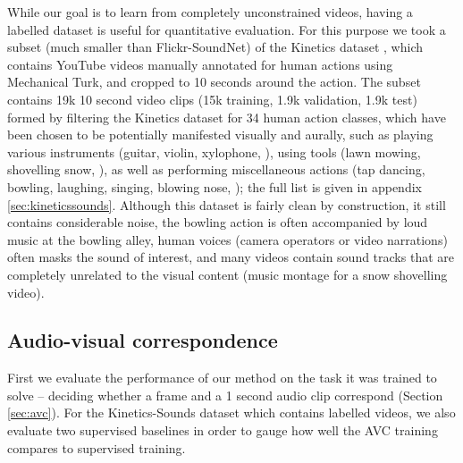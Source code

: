 \documentclass[10pt,twocolumn,letterpaper]{article}
\renewcommand{\paragraph}[1]{\smallskip\noindent{\bf{#1}}}
\begin{document}
\paragraph{Kinetics-Sounds.}
While our goal is to learn from completely unconstrained videos,
having a labelled dataset is useful for quantitative evaluation.
%
%
%
%
%
%
%
For this purpose we took a subset (much smaller than Flickr-SoundNet) of
the Kinetics dataset \cite{Kay17}, which contains YouTube videos
manually annotated for human actions using Mechanical Turk, and cropped
to 10 seconds around the action.
The subset contains 19k 10 second video clips
(15k training, 1.9k validation, 1.9k test)
formed by filtering the Kinetics dataset for 34 human action
classes, which have been chosen to be potentially manifested
visually and aurally, such as
playing various instruments (guitar, violin, xylophone, \etc),
using tools (lawn mowing, shovelling snow, \etc),
as well as performing miscellaneous actions
(tap dancing, bowling, laughing, singing, blowing nose, \etc);
the full list is given in appendix \ref{sec:kineticssounds}.
Although this dataset is fairly clean by construction, it still contains
considerable noise, \eg the bowling action is often accompanied by loud music
at the bowling alley, human voices (camera operators or video narrations)
often masks the sound of interest, and many videos contain sound tracks
that are completely unrelated to the visual content
(\eg music montage for a snow shovelling video).

%

%
\subsection{Audio-visual correspondence}

First we evaluate the performance of our method on the task it was trained
to solve -- deciding whether a frame and a 1 second audio clip
correspond (Section \ref{sec:avc}).
For the Kinetics-Sounds dataset which contains labelled videos,
we also evaluate two supervised baselines in order to gauge how well
the AVC training compares to supervised training.
\end{document}
